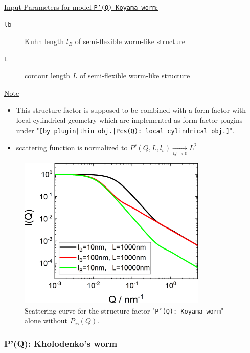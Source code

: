 \vspace{5mm}

\hspace{1pt}\\
\underline{Input Parameters for model \texttt{P'(Q) Koyama worm}:}\\
\begin{description}
\item[\texttt{lb}] Kuhn length $l_B$ of semi-flexible worm-like structure
\item[\texttt{L}] contour length $L$ of semi-flexible worm-like structure
\end{description}

\noindent
\underline{Note}
\begin{itemize}
  \item This structure factor is supposed to be combined with a form factor with local cylindrical geometry which are implemented as form factor plugins
under "\texttt{[by plugin|thin obj.|Pcs(Q): local cylindrical obj.]}".
  \item scattering function is normalized to $P'(Q,L,l_b) \xrightarrow[Q\rightarrow 0]{} L^2$
\end{itemize}

\begin{figure}[htb]
\begin{center}
\includegraphics[width=0.8\textwidth]{../images/form_factor/polymer_semiflexible/PprimeKoyamaWorm.png}
\end{center}
\caption{Scattering curve for the structure factor "\texttt{P'(Q): Koyama worm}" alone without $P_\mathrm{cs}(Q)$.}
\label{fig_IQ:PprimeKoyamaWorm}
\end{figure}

\clearpage
\subsubsection{P'(Q): Kholodenko's worm} ~\\
\label{plugin:Pprime4kohlodenko}

